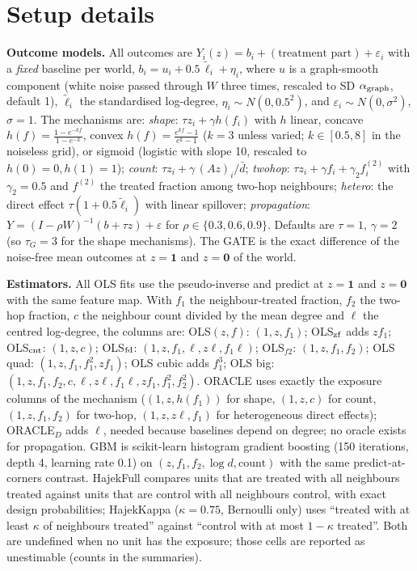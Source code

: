 \appendix
\section{Setup details}
\label{app:setup}
\textbf{Outcome models.} All outcomes are $Y_i(z)=b_i+(\text{treatment part})+\varepsilon_i$ with a \emph{fixed} baseline per world, $b_i=u_i+0.5\,\tilde\ell_i+\eta_i$, where $u$ is a graph-smooth component (white noise passed through $W$ three times, rescaled to SD $\alpha_{\rm graph}$, default 1), $\tilde\ell_i$ the standardised log-degree, $\eta_i\sim N(0,0.5^2)$, and $\varepsilon_i\sim N(0,\sigma^2)$, $\sigma=1$. The mechanisms are:
\emph{shape}: $\tau z_i+\gamma h(f_i)$ with $h$ linear, concave $h(f)=\frac{1-e^{-kf}}{1-e^{-k}}$, convex $h(f)=\frac{e^{kf}-1}{e^{k}-1}$ ($k=3$ unless varied; $k\in[0.5,8]$ in the noiseless grid), or sigmoid (logistic with slope 10, rescaled to $h(0)=0,h(1)=1$);
\emph{count}: $\tau z_i+\gamma\,(Az)_i/\bar d$; \emph{twohop}: $\tau z_i+\gamma f_i+\gamma_2 f^{(2)}_i$ with $\gamma_2=0.5$ and $f^{(2)}$ the treated fraction among two-hop neighbours; \emph{hetero}: the direct effect $\tau(1+0.5\tilde\ell_i)$ with linear spillover; \emph{propagation}: $Y=(I-\rho W)^{-1}(b+\tau z)+\varepsilon$ for $\rho\in\{0.3,0.6,0.9\}$. Defaults are $\tau=1$, $\gamma=2$ (so $\tau_G=3$ for the shape mechanisms).
The GATE is the exact difference of the noise-free mean outcomes at $z=\mathbf 1$ and $z=\mathbf 0$ of the world.

\textbf{Estimators.} All OLS fits use the pseudo-inverse and predict at $z=\mathbf 1$ and $z=\mathbf 0$ with the same feature map. With $f_1$ the neighbour-treated fraction, $f_2$ the two-hop fraction, $c$ the neighbour count divided by the mean degree and $\ell$ the centred log-degree, the columns are: OLS$(z,f)$: $(1,z,f_1)$; OLS$_{\rm zf}$ adds $zf_1$; OLS$_{\rm cnt}$: $(1,z,c)$; OLS$_{\rm fd}$: $(1,z,f_1,\ell,z\ell,f_1\ell)$; OLS$_{f2}$: $(1,z,f_1,f_2)$; OLS quad: $(1,z,f_1,f_1^2,zf_1)$; OLS cubic adds $f_1^3$; OLS big: $(1,z,f_1,f_2,c,\ell,z\ell,f_1\ell,zf_1,f_1^2,f_2^2)$. ORACLE uses exactly the exposure columns of the mechanism ($(1,z,h(f_1))$ for shape, $(1,z,c)$ for count, $(1,z,f_1,f_2)$ for two-hop, $(1,z,z\ell,f_1)$ for heterogeneous direct effects); ORACLE$_D$ adds $\ell$, needed because baselines depend on degree; no oracle exists for propagation. GBM is scikit-learn histogram gradient boosting (150 iterations, depth 4, learning rate 0.1) on $(z,f_1,f_2,\log d,\text{count})$ with the same predict-at-corners contrast. HajekFull compares units that are treated with all neighbours treated against units that are control with all neighbours control, with exact design probabilities; HajekKappa ($\kappa=0.75$, Bernoulli only) uses ``treated with at least $\kappa$ of neighbours treated'' against ``control with at most $1-\kappa$ treated''. Both are undefined when no unit has the exposure; those cells are reported as unestimable (counts in the summaries).


